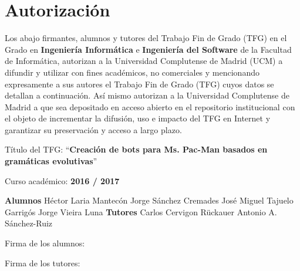 \chapter{Autorización}
Los abajo firmantes, alumnos y tutores del Trabajo Fin de Grado (TFG) en el Grado en \textbf{Ingeniería Informática} e \textbf{Ingeniería del Software} de la Facultad de Informática, autorizan a la Universidad Complutense de Madrid (UCM) a difundir y utilizar con fines académicos, no comerciales y mencionando expresamente a sus autores el Trabajo Fin de Grado (TFG) cuyos datos se detallan a continuación. Así mismo autorizan a la Universidad Complutense de Madrid a que sea depositado en acceso abierto en el repositorio institucional con el objeto de incrementar la difusión, uso e impacto del TFG en Internet y garantizar su preservación y acceso a largo plazo.
 
Título del TFG: ``\textbf{Creación de bots para Ms. Pac-Man basados en gramáticas evolutivas}''
 
Curso académico: \textbf{2016 / 2017}

           \textbf{Alumnos}
Héctor Laria Mantecón     Jorge Sánchez Cremades 
José Miguel Tajuelo Garrigós    Jorge Vieira Luna
\textbf{Tutores}
Carlos Cervigon Rückauer     Antonio A. Sánchez-Ruiz

Firma de los alumnos:

Firma de los tutores:
